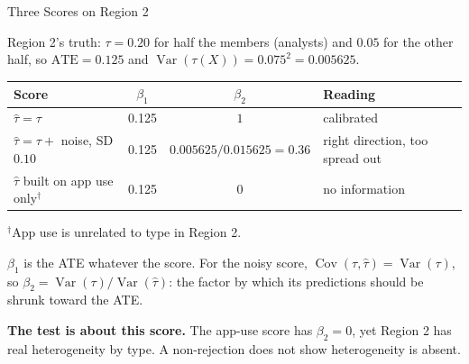 \documentclass[aspectratio=169, 11pt, handout]{beamer}
\newcommand{\Var}{\operatorname{Var}}
\newcommand{\Cov}{\operatorname{Cov}}
\newcommand{\hatt}{\hat{\tau}}
\newcommand{\ATE}{\text{ATE}}
\begin{document}
\begin{frame}{Three Scores on Region 2}

Region 2's truth: $\tau = 0.20$ for half the members (analysts) and $0.05$ for the other half, so $\ATE = 0.125$ and $\Var(\tau(X)) = 0.075^2 = 0.005625$.

\begin{center}
\small
\begin{tabular}{lccl}
\toprule
\textbf{Score} & $\beta_1$ & $\beta_2$ & \textbf{Reading} \\
\midrule
$\hatt = \tau$ & 0.125 & $1$ & calibrated \\
$\hatt = \tau + $ noise, SD $0.10$ & 0.125 & $0.005625/0.015625 = 0.36$ & right direction, too spread out \\
$\hatt$ built on app use only$^{\dagger}$ & 0.125 & $0$ & no information \\
\bottomrule
\end{tabular}
\end{center}

\vspace{-0.3em}
{\footnotesize $^{\dagger}$App use is unrelated to type in Region 2.}

\medskip

$\beta_1$ is the ATE whatever the score. For the noisy score, $\Cov(\tau, \hatt) = \Var(\tau)$, so $\beta_2 = \Var(\tau)/\Var(\hatt)$: the factor by which its predictions should be shrunk toward the ATE.

\bigskip

\textbf{The test is about this score.} The app-use score has $\beta_2 = 0$, yet Region 2 has real heterogeneity by type. A non-rejection does not show heterogeneity is absent.
\end{frame}
\end{document}

